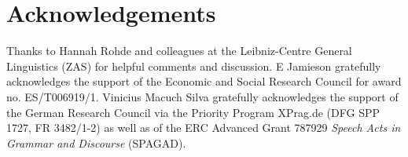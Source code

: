 \documentclass[output=paper,colorlinks,citecolor=brown]{langscibook}
\begin{document}

\section*{Acknowledgements}

Thanks to Hannah Rohde and colleagues at the Leibniz-Centre General Linguistics (ZAS) for helpful comments and discussion. E Jamieson gratefully acknowledges the support of the Economic and Social Research Council for award no. ES/T006919/1. Vinicius Macuch Silva gratefully acknowledges the support of the German Research Council via the Priority Program XPrag.de (DFG SPP 1727, FR 3482/1-2) as well as of the ERC Advanced Grant 787929 \textit{Speech Acts in Grammar and Discourse} (SPAGAD).

\printbibliography[heading=subbibliography,notkeyword=this]
\end{document}
